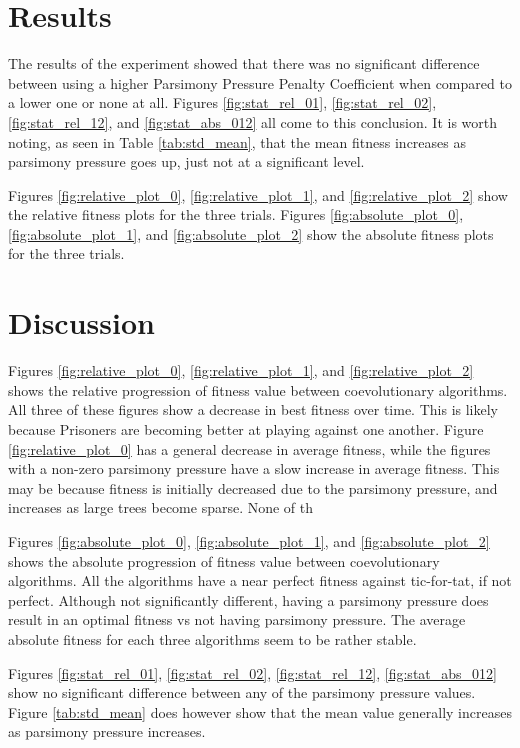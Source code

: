 \documentclass[times]{article}
\begin{document}
	\section{Results}

	The results of the experiment showed that there was no significant difference between using a higher Parsimony Pressure Penalty Coefficient when compared to a lower one or none at all. Figures \ref{fig:stat_rel_01}, \ref{fig:stat_rel_02}, \ref{fig:stat_rel_12}, and \ref{fig:stat_abs_012} all come to this conclusion. It is worth noting, as seen in Table \ref{tab:std_mean}, that the mean fitness increases as parsimony pressure goes up, just not at a significant level.

	Figures \ref{fig:relative_plot_0}, \ref{fig:relative_plot_1}, and \ref{fig:relative_plot_2} show the relative fitness plots for the three trials. Figures \ref{fig:absolute_plot_0}, \ref{fig:absolute_plot_1}, and \ref{fig:absolute_plot_2} show the absolute fitness plots for the three trials.

	\section{Discussion}

	Figures \ref{fig:relative_plot_0}, \ref{fig:relative_plot_1}, and \ref{fig:relative_plot_2} shows the relative progression of fitness value between coevolutionary algorithms. All three of these figures show a decrease in best fitness over time. This is likely because Prisoners are becoming better at playing against one another. Figure \ref{fig:relative_plot_0} has a general decrease in average fitness, while the figures with a non-zero parsimony pressure have a slow increase in average fitness. This may be because fitness is initially decreased due to the parsimony pressure, and increases as large trees become sparse. None of th

	Figures \ref{fig:absolute_plot_0}, \ref{fig:absolute_plot_1}, and \ref{fig:absolute_plot_2} shows the absolute progression of fitness value between coevolutionary algorithms. All the algorithms have a near perfect fitness against tic-for-tat, if not perfect. Although not significantly different, having a parsimony pressure does result in an optimal fitness vs not having parsimony pressure. The average absolute fitness for each three algorithms seem to be rather stable.


	Figures \ref{fig:stat_rel_01}, \ref{fig:stat_rel_02}, \ref{fig:stat_rel_12}, \ref{fig:stat_abs_012} show no significant difference between any of the parsimony pressure values. Figure \ref{tab:std_mean} does however show that the mean value generally increases as parsimony pressure increases.
\end{document}
